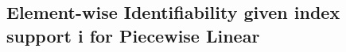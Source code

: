 \documentclass{article} %
\theoremstyle{plain}
\theoremstyle{definition}
\theoremstyle{remark}
\numberwithin{equation}{section}
\begin{document}


\subsection{Element-wise Identifiability given index support i for Piecewise Linear}\label{app:propositionpiecewiselinearsupportindex}
\end{document}
